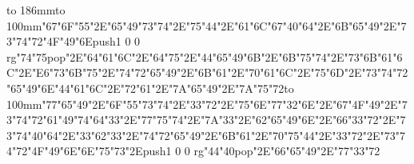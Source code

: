 \hbox to 186mm{\hsize=81mm\vbox to 100mm{\vfill\ipa\char"67\ipa\char"6F\ipa\char"55\ipa\char"2E\ipa\char"65\ipa\char"49\ipa\char"73\ipa\char"74\ipa\char"2E\ipa\char"75\ipa\char"44\ipa\char"2E\ipa\char"61\ipa\char"6C\medskip\ipa\char"67\ipa\char"40\ipa\char"64\ipa\char"2E\ipa\char"6B\ipa\char"65\ipa\char"49\ipa\char"2E\ipa\char"73\ipa\char"74\ipa\char"72\ipa\char"4F\ipa\char"49\ipa\char"6E\medskip\pdfcolorstack\match push{1 0 0 rg}\ipa\char"74\ipa\char"75\pdfcolorstack\match pop{}\ipa\char"2E\ipa\char"64\ipa\char"61\ipa\char"6C\ipa\char"2E\ipa\char"64\ipa\char"75\ipa\char"2E\ipa\char"44\ipa\char"65\ipa\char"49\ipa\char"6B\ipa\char"2E\ipa\char"6B\ipa\char"75\ipa\char"74\ipa\char"2E\ipa\char"73\ipa\char"6B\ipa\char"61\ipa\char"6C\ipa\char"2E\ipa\char"E6\ipa\char"73\ipa\char"6B\medskip\ipa\char"75\ipa\char"2E\ipa\char"74\ipa\char"72\ipa\char"65\ipa\char"49\ipa\char"2E\ipa\char"6B\ipa\char"61\ipa\char"2E\ipa\char"70\ipa\char"61\ipa\char"6C\ipa\char"2E\ipa\char"75\ipa\char"6D\ipa\char"2E\ipa\char"73\ipa\char"74\ipa\char"72\ipa\char"65\ipa\char"49\ipa\char"6E\medskip\ipa\char"44\ipa\char"61\ipa\char"6C\ipa\char"2E\ipa\char"72\ipa\char"61\ipa\char"2E\ipa\char"7A\ipa\char"65\ipa\char"49\ipa\char"2E\ipa\char"7A\ipa\char"75\ipa\char"72\vfill}\hfill\vbox to 100mm{\vfill\ipa\char"77\ipa\char"65\ipa\char"49\ipa\char"2E\ipa\char"6F\ipa\char"55\ipa\char"73\ipa\char"74\ipa\char"2E\ipa\char"33\ipa\char"72\ipa\char"2E\ipa\char"75\ipa\char"6E\medskip\ipa\char"77\ipa\char"32\ipa\char"6E\ipa\char"2E\ipa\char"67\ipa\char"4F\ipa\char"49\ipa\char"2E\ipa\char"73\ipa\char"74\ipa\char"72\ipa\char"61\ipa\char"49\ipa\char"74\medskip\ipa\char"64\ipa\char"33\ipa\char"2E\ipa\char"77\ipa\char"75\ipa\char"74\ipa\char"2E\ipa\char"7A\ipa\char"33\ipa\char"2E\ipa\char"62\ipa\char"65\ipa\char"49\ipa\char"6E\ipa\char"2E\ipa\char"66\ipa\char"33\ipa\char"72\ipa\char"2E\ipa\char"73\ipa\char"74\ipa\char"40\ipa\char"64\ipa\char"2E\ipa\char"33\ipa\char"62\medskip\ipa\char"33\ipa\char"2E\ipa\char"74\ipa\char"72\ipa\char"65\ipa\char"49\ipa\char"2E\ipa\char"6B\ipa\char"61\ipa\char"2E\ipa\char"70\ipa\char"75\ipa\char"44\ipa\char"2E\ipa\char"33\ipa\char"72\ipa\char"2E\ipa\char"73\ipa\char"74\ipa\char"72\ipa\char"4F\ipa\char"49\ipa\char"6E\medskip\ipa\char"6E\ipa\char"75\ipa\char"73\ipa\char"2E\pdfcolorstack\match push{1 0 0 rg}\ipa\char"44\ipa\char"40\pdfcolorstack\match pop{}\ipa\char"2E\ipa\char"66\ipa\char"65\ipa\char"49\ipa\char"2E\ipa\char"77\ipa\char"33\ipa\char"72\vfill}}\eject
